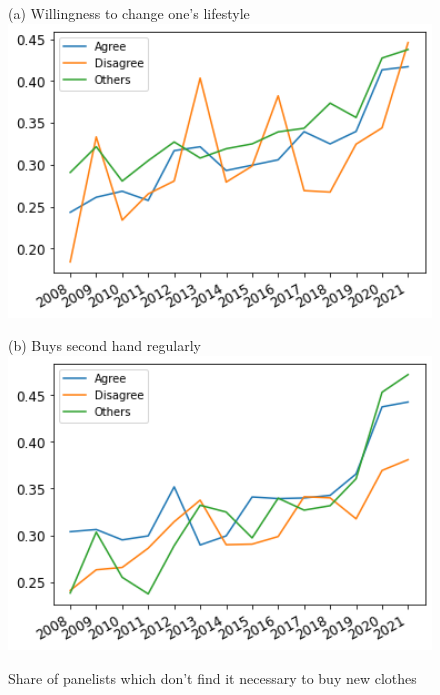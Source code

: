 \documentclass[12pt]{article}
\begin{document}
\begin{figure}[h!!]
	\centering	
	\caption{{Share of panelists which don't find it necessary to buy new clothes }}\label{fig:evolution_notNecessary_bygroup:clothes}	
	\begin{minipage}[h!!]{0.32\textwidth}
		\centering\footnotesize{(a) Willingness to change one's lifestyle}
		\includegraphics[width=1\textwidth]{../codding_data/results/liss/broad_groups_notnecessaryqk20a175_ci306.png}
	\end{minipage}
	\begin{minipage}[h!!]{0.32\textwidth}
		\centering\footnotesize{(b) Buys second hand regularly}
		\includegraphics[width=1\textwidth]{../codding_data/results/liss/broad_groups_notnecessaryqk20a135_ci306.png}
	\end{minipage}

\end{figure}
\end{document}
